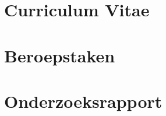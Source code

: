\chapter{Curriculum Vitae}
\label{appendix:CurriculumVitae}
\newpage
{}
\newpage

\chapter{Beroepstaken}
\label{appendix:Beroepstaken}
\newpage
{}
\newpage

\chapter{Onderzoeksrapport}
\label{appendix:Onderzoeksrapport}
\newpage
{}
\newpage
